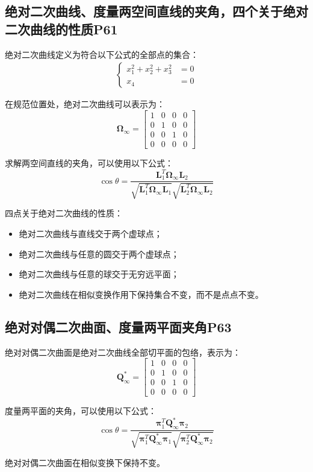 \documentclass[11pt]{article}
\begin{document}
\subsection{	绝对二次曲线、度量两空间直线的夹角，四个关于绝对二次曲线的性质P61}
绝对二次曲线定义为符合以下公式的全部点的集合：
\begin{align*}
  \left\{
    \begin{aligned}
      x_1^2+x_2^2+x_3^2&=0\\
      x_4&=0
    \end{aligned}
  \right.
\end{align*}\par
在规范位置处，绝对二次曲线可以表示为：
\begin{equation*}
  \mathbold{\Omega}_\infty=\begin{bmatrix}
    1 & 0 & 0 & 0 \\
    0 & 1 & 0 & 0 \\
    0 & 0 & 1 & 0 \\
    0 & 0 & 0 & 0
  \end{bmatrix}
\end{equation*}\par
求解两空间直线的夹角，可以使用以下公式：
\begin{equation*}
  \cos\theta=\frac{\mathbf{L}_1^T\mathbold{\Omega}_\infty\mathbf{L}_2}{\sqrt{\mathbf{L}_1^T\mathbold{\Omega}_\infty\mathbf{L}_1}\sqrt{\mathbf{L}_2^T\mathbold{\Omega}_\infty\mathbf{L}_2}}
\end{equation*}\par
四点关于绝对二次曲线的性质：
\begin{itemize}
  \item 绝对二次曲线与直线交于两个虚球点；
  \item 绝对二次曲线与任意的圆交于两个虚球点；
  \item 绝对二次曲线与任意的球交于无穷远平面；
  \item 绝对二次曲线在相似变换作用下保持集合不变，而不是点点不变。
\end{itemize}
\subsection{绝对对偶二次曲面、度量两平面夹角P63}
绝对对偶二次曲面是绝对二次曲线全部切平面的包络，表示为：
\begin{equation*}
  \mathbf{Q}^*_\infty=\begin{bmatrix}
    1 & 0 & 0 & 0 \\
    0 & 1 & 0 & 0 \\
    0 & 0 & 1 & 0 \\
    0 & 0 & 0 & 0
  \end{bmatrix}
\end{equation*}\par
度量两平面的夹角，可以使用以下公式：
\begin{equation*}
  \cos\theta=\frac{\mathbold{\pi}_1^T\mathbf{Q}^*_\infty\mathbold{\pi}_2}{\sqrt{\mathbold{\pi}_1^T\mathbf{Q}^*_\infty\mathbold{\pi}_1}\sqrt{\mathbold{\pi}_2^T\mathbf{Q}^*_\infty\mathbold{\pi}_2}}
\end{equation*}\par
绝对对偶二次曲面在相似变换下保持不变。
\end{document}
